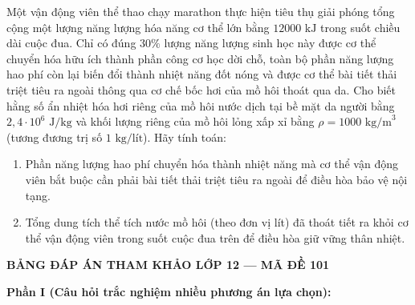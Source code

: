\begin{ex}	Một vận động viên thể thao chạy marathon thực hiện tiêu thụ giải phóng tổng cộng một lượng năng lượng hóa năng cơ thể lớn bằng $12000\text{ kJ}$ trong suốt chiều dài cuộc đua. Chỉ có đúng $30\%$ lượng năng lượng sinh học này được cơ thể chuyển hóa hữu ích thành phần công cơ học dời chỗ, toàn bộ phần năng lượng hao phí còn lại biến đổi thành nhiệt năng đốt nóng và được cơ thể bài tiết thải triệt tiêu ra ngoài thông qua cơ chế bốc hơi của mồ hôi thoát qua da. Cho biết hằng số ẩn nhiệt hóa hơi riêng của mồ hôi nước dịch tại bề mặt da người bằng $2,4 \cdot 10^6\text{ J/kg}$ và khối lượng riêng của mồ hôi lỏng xấp xỉ bằng $\rho = 1000\text{ kg/m}^3$ (tương đương trị số $1\text{ kg/lít}$). Hãy tính toán:
	\begin{enumerate}
		\item[a)] Phần năng lượng hao phí chuyển hóa thành nhiệt năng mà cơ thể vận động viên bắt buộc cần phải bài tiết thải triệt tiêu ra ngoài để điều hòa bảo vệ nội tạng.
		\item[b)] Tổng dung tích thể tích nước mồ hôi (theo đơn vị lít) đã thoát tiết ra khỏi cơ thể vận động viên trong suốt cuộc đua trên để điều hòa giữ vững thân nhiệt.
	\end{enumerate}
\end{ex}


\newpage
\begin{center} \textbf{BẢNG ĐÁP ÁN THAM KHẢO LỚP 12 --- MÃ ĐỀ 101} \end{center}

\noindent \textbf{Phần I (Câu hỏi trắc nghiệm nhiều phương án lựa chọn):}
